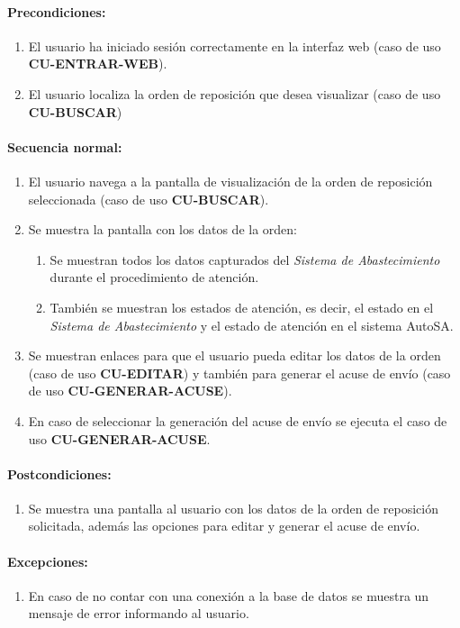 \paragraph{Precondiciones:}
\begin{enumerate}
  \item El usuario ha iniciado sesión correctamente en la interfaz web (caso de uso \textbf{CU-ENTRAR-WEB}).
  \item El usuario localiza la orden de reposición que desea visualizar (caso de uso \textbf{CU-BUSCAR})
\end{enumerate}
\paragraph{Secuencia normal:}
\begin{enumerate}
  \item El usuario navega a la pantalla de visualización de la orden de reposición seleccionada (caso de uso \textbf{CU-BUSCAR}).
  \item Se muestra la pantalla con los datos de la orden:
  \begin{enumerate}
    \item Se muestran todos los datos capturados del \textit{Sistema de Abastecimiento} durante el procedimiento de atención.
    \item También se muestran los estados de atención, es decir, el estado en el \textit{Sistema de Abastecimiento}  y el estado de atención en el sistema AutoSA.
  \end{enumerate}
  \item Se muestran enlaces para que el usuario pueda editar los datos de la orden (caso de uso \textbf{CU-EDITAR}) y también para generar el acuse de envío (caso de uso \textbf{CU-GENERAR-ACUSE}).
  \item En caso de seleccionar la generación del acuse de envío se ejecuta el caso de uso \textbf{CU-GENERAR-ACUSE}.
\end{enumerate}
\paragraph{Postcondiciones:}
\begin{enumerate}
  \item Se muestra una pantalla al usuario con los datos de la orden de reposición solicitada, además las opciones para editar y generar el acuse de envío.
\end{enumerate}
\paragraph{Excepciones:}
\begin{enumerate}
  \item En caso de no contar con una conexión a la base de datos se muestra un mensaje de error informando al usuario.
\end{enumerate}


